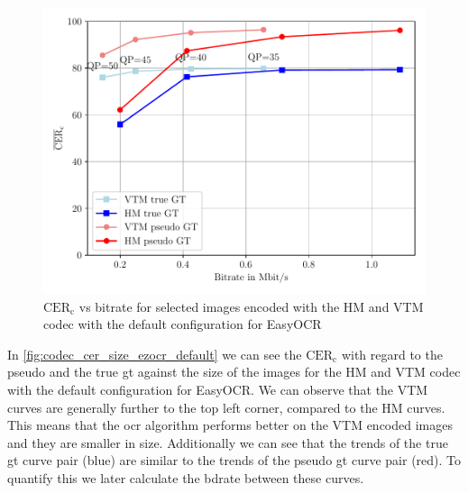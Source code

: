 \begin{figure}[h!]
    \centering
    \includegraphics[width=\textwidth]{../images/analyze/codec_cer_size_ezocr_default.pdf}
    \caption{$\text{CER}_{\text{c}}$ vs bitrate for selected images encoded with the HM and VTM codec with the default configuration for EasyOCR}
    \label{fig:codec_cer_size_ezocr_default}
\end{figure}

In \autoref{fig:codec_cer_size_ezocr_default} we can see the $\text{CER}_{\text{c}}$ with regard to the pseudo and the true \gls{gt} against the size of the images for the HM and VTM codec with the default configuration for EasyOCR.
We can observe that the VTM curves are generally further to the top left corner, compared to the HM curves.
This means that the \gls{ocr} algorithm performs better on the VTM encoded images and they are smaller in size.
Additionally we can see that the trends of the true \gls{gt} curve pair (blue) are similar to the trends of the pseudo \gls{gt} curve pair (red).
To quantify this we later calculate the \gls{bdrate} between these curves.

